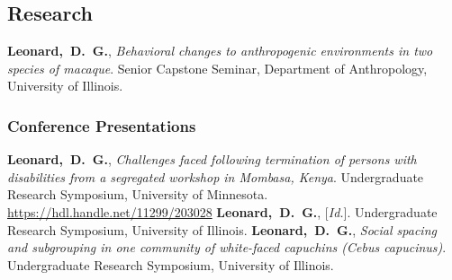 \subsection{Research}
	{{\textbf{Leonard,~D.~G.}}, {\textit{Behavioral changes to anthropogenic environments in two species of macaque}}. Senior Capstone Seminar, Department of Anthropology, University of Illinois.}

\subsubsection{Conference Presentations}
	{{\textbf{Leonard,~D.~G.}}, {\textit{Challenges faced following termination of persons with disabilities from a segregated workshop in Mombasa, Kenya}}. Undergraduate Research Symposium, University of Minnesota. \url{https://hdl.handle.net/11299/203028}}
	{{\textbf{Leonard,~D.~G.}}, [{\textit{Id.}}]. Undergraduate Research Symposium, University of Illinois.}
	{{\textbf{Leonard,~D.~G.}}, {\textit{Social spacing and subgrouping in one community of white-faced capuchins (\emph{Cebus capucinus})}}. Undergraduate Research Symposium, University of Illinois.}

\iffalse
\section{Awards and Grants}
\secitemgrant
	{2019}
	{175}
	{Travel Grant}
	{University of Illinois Department of Undergraduate Research}
	{}
	{University of Minnesota Undergraduate Research Symposium}
	{}
\fi

